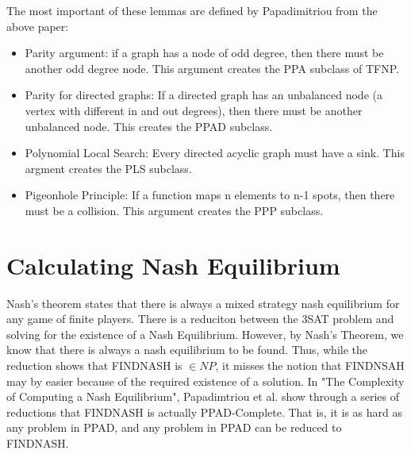 \documentclass[10pt]{article}
\theoremstyle{definition}
\theoremstyle{remark}
\theoremstyle{definition}
\begin{document}
The most important of these lemmas are defined by Papadimitriou from the above paper:

\begin{itemize}
    \item Parity argument: if a graph has a node of odd degree, then there must be another odd degree node. This argument creates the PPA subclass of TFNP.
    \item Parity for directed graphs: If a directed graph has an unbalanced node (a vertex with different in and out degrees), then there must be another unbalanced node. This creates the PPAD subclass.
    \item Polynomial Local Search: Every directed acyclic graph must have a sink. This argment creates the PLS subclass.
    \item Pigeonhole Principle: If a function maps n elements to n-1 spots, then there must be a collision. This argument creates the PPP subclass.
\end{itemize}

\section{Calculating Nash Equilibrium}
    Nash's theorem states that there is always a mixed strategy nash equilibrium for any game of finite players. There is a reduciton between the 3SAT problem and solving for the existence of a Nash Equilibrium. However, by Nash's Theorem, we know that there is always a nash equilibrium to be found. Thus, while the reduction shows that FINDNASH is $\in NP$, it misses the notion that FINDNSAH may by easier because of the required existence of a solution. In "The Complexity of Computing a Nash Equilibrium", Papadimtriou et al. show through a series of reductions that FINDNASH is actually PPAD-Complete. That is, it is as hard as any problem in PPAD, and any problem in PPAD can be reduced to FINDNASH.
\end{document}
